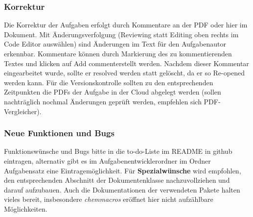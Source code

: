 \documentclass[./main.tex]{subfiles}
\begin{document}
\subsubsection{Korrektur}
Die Korrektur der Aufgaben erfolgt durch Kommentare an der PDF oder hier im Dokument. Mit \"Anderungsverfolgung (Reviewing statt Editing oben rechts im Code Editor auswählen) sind \"Anderungen im Text f\"ur den Aufgabenautor erkennbar. Kommentare können durch Markierung des zu kommentierenden Textes und klicken auf \glqq Add comment\grqq  erstellt werden. Nachdem dieser Kommentar eingearbeitet wurde, sollte er resolved werden statt gelöscht, da er so Re-opened werden kann. 
F\"ur die Versionskontrolle sollten zu den entsprechenden Zeitpunkten die PDFs der Aufgabe in der Cloud abgelegt werden (sollen nachtr\"aglich nochmal \"Anderungen gepr\"uft werden, empfehlen sich PDF-Vergleicher). 

\subsubsection{Neue Funktionen und Bugs}
Funktionsw\"unsche und Bugs bitte in die to-do-Liste im README in github eintragen, alternativ gibt es im Aufgabenentwicklerordner im Ordner Aufgabensatz eine Eintragem\"oglichkeit.
F\"ur \textbf{Spezialw\"unsche} wird empfohlen, den entsprechenden Abschnitt der Dokumentenklasse nachzuvollziehen und darauf aufzubauen. Auch die Dokumentationen der verwendeten Pakete halten vieles bereit, insbesondere \textit{chemmacros} er\"offnet hier nicht aufz\"ahlbare M\"oglichkeiten. \par 
\newpage
\end{document}
